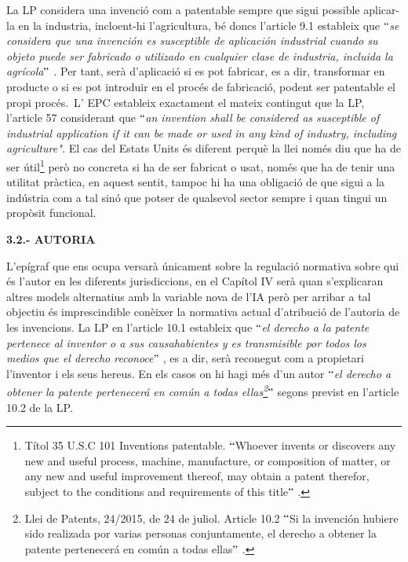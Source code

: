 \documentclass[12pt]{article}
\begin{document}
\vspace{\baselineskip}
\begin{justify}
La LP considera una invenció com a patentable sempre que sigui possible aplicar-la en la industria, incloent-hi l’agricultura, bé doncs l’article 9.1 estableix que $``$\textit{se considera que una invención es susceptible de aplicación industrial cuando su objeto puede ser fabricado o utilizado en cualquier clase de industria, incluida la agrícola$"$ .} Per tant, serà d’aplicació si es pot fabricar, es a dir, transformar en producte o si es pot introduir en el procés de fabricació, podent ser patentable el propi procés.\  L’ EPC estableix exactament el mateix contingut que la LP, l’article 57 considerant que $``$\textit{an invention shall be considered as susceptible of industrial application if it can be made or used in any kind of industry, including agriculture". }El cas del Estats Units és diferent perquè la llei només diu que ha de ser útil\footnote{ Títol 35 U.S.C 101 Inventions patentable. $``$Whoever invents or discovers any new and useful process, machine, manufacture, or composition of matter, or any new and useful improvement thereof, may obtain a patent therefor, subject to the conditions and requirements of this title$"$ .  } però no concreta si ha de ser fabricat o usat, només que ha de tenir una utilitat pràctica, en aquest sentit, tampoc hi ha una obligació de que sigui a la indústria com a tal sinó que potser de qualsevol sector sempre i quan tingui un propòsit funcional.
\end{justify}\par


\vspace{\baselineskip}
\begin{justify}
\textbf{3.2.- AUTORIA }
\end{justify}\par


\vspace{\baselineskip}
\begin{justify}
L’epígraf que ens ocupa versarà únicament sobre la regulació normativa sobre qui és l’autor en les diferents jurisdiccions, en el Capítol IV serà quan s’explicaran altres models alternatius amb la variable nova de l’IA però per arribar a tal objectiu és imprescindible conèixer la normativa actual d’atribució de l’autoria de les invencions.  La LP en l’article 10.1 estableix que \textit{$``$el derecho a la patente pertenece al inventor o a sus causahabientes y es transmisible por todos los medios que el derecho reconoce$"$ }, es a dir, serà reconegut com a propietari l’inventor i els seus hereus. En els casos on hi hagi més d’un autor $``$\textit{el derecho a obtener la patente pertenecerá en común a todas ellas\footnote{ Llei de Patents, 24/2015, de 24 de juliol. Article 10.2 $``$Si la invención hubiere sido realizada por varias personas conjuntamente, el derecho a obtener la patente pertenecerá en común a todas ellas$"$ . }$"$ } segons previst en l’article 10.2 de la LP. 
\end{justify}\par
\end{document}
